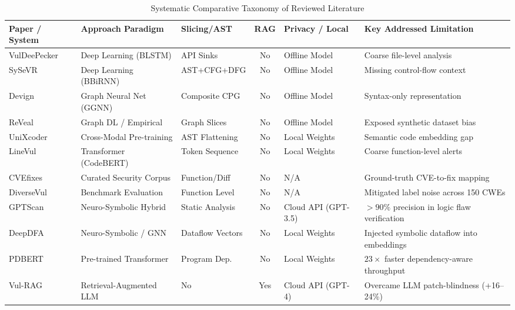 \documentclass[10pt,twocolumn]{article}
\begin{document}
\begin{table}[!t]
\centering
\caption{Systematic Comparative Taxonomy of Reviewed Literature}
\vspace{3pt}
\scriptsize
\setlength{\tabcolsep}{3.5pt}
\begin{tabular}{|p{2.5cm}|p{3.2cm}|p{2.0cm}|c|p{2.1cm}|p{5.6cm}|}
\hline
\textbf{Paper / System} & \textbf{Approach Paradigm} & \textbf{Slicing/AST} & \textbf{RAG} & \textbf{Privacy / Local} & \textbf{Key Addressed Limitation} \\
\hline
VulDeePecker~\cite{li2018vuldeepecker} & Deep Learning (BLSTM) & API Sinks & No & Offline Model & Coarse file-level analysis \\
SySeVR~\cite{li2021sysevr} & Deep Learning (BBiRNN) & AST+CFG+DFG & No & Offline Model & Missing control-flow context \\
Devign~\cite{zhou2019devign} & Graph Neural Net (GGNN) & Composite CPG & No & Offline Model & Syntax-only representation \\
ReVeal~\cite{chakraborty2021reveal} & Graph DL / Empirical & Graph Slices & No & Offline Model & Exposed synthetic dataset bias \\
UniXcoder~\cite{guo2022unixcoder} & Cross-Modal Pre-training & AST Flattening & No & Local Weights & Semantic code embedding gap \\
LineVul~\cite{fu2022linevul} & Transformer (CodeBERT) & Token Sequence & No & Local Weights & Coarse function-level alerts \\
CVEfixes~\cite{bhandari2021cvefixes} & Curated Security Corpus & Function/Diff & No & N/A & Ground-truth CVE-to-fix mapping \\
DiverseVul~\cite{chen2023diversevul} & Benchmark Evaluation & Function Level & No & N/A & Mitigated label noise across 150 CWEs \\
GPTScan~\cite{sun2024gptscan} & Neuro-Symbolic Hybrid & Static Analysis & No & Cloud API (GPT-3.5) & $>90\%$ precision in logic flaw verification \\
DeepDFA~\cite{steenhoek2024deepdfa} & Neuro-Symbolic / GNN & Dataflow Vectors & No & Local Weights & Injected symbolic dataflow into embeddings \\
PDBERT~\cite{liu2024pdbert} & Pre-trained Transformer & Program Dep. & No & Local Weights & $23\times$ faster dependency-aware throughput \\
Vul-RAG~\cite{du2024vulrag} & Retrieval-Augmented LLM & No & Yes & Cloud API (GPT-4) & Overcame LLM patch-blindness (+16--24\%) \\

\end{tabular}
\end{table}
\end{document}
